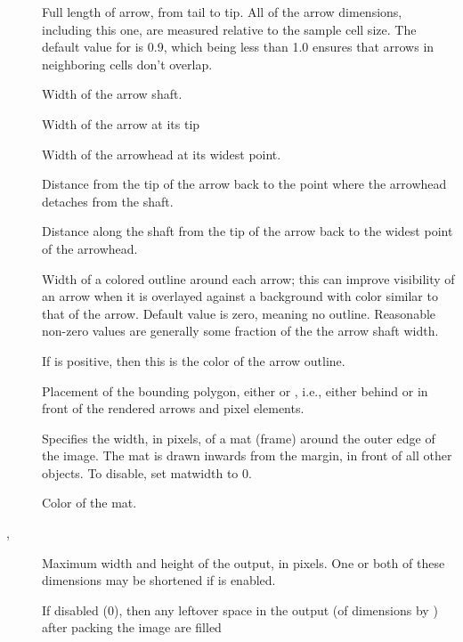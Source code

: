\begin{description}
\item[]
  Full length of arrow, from tail to tip. All of the arrow dimensions,
  including this one, are measured relative to the sample cell size. The
  default value for  is 0.9, which being less than 1.0
  ensures that arrows in neighboring cells don't overlap.
\item[]
  Width of the arrow shaft.
\item[]
  Width of the arrow at its tip
\item[]
  Width of the arrowhead at its widest point.
\item[]
  Distance from the tip of the arrow back to the point where the
  arrowhead detaches from the shaft.
\item[]
  Distance along the shaft from the tip of the arrow back to the widest
  point of the arrowhead.
\item[]
 Width of a colored outline around each arrow; this can improve
 visibility of an arrow when it is overlayed against a background with
 color similar to that of the arrow.  Default value is zero, meaning no
 outline. Reasonable non-zero values are generally some fraction of the
 the arrow shaft width.
\item[]
 If  is positive, then this is the color of the
 arrow outline.
\item[]
 Placement of the bounding polygon, either  or ,
 i.e., either behind or in front of the rendered arrows and pixel
 elements.
\item[]
 Specifies the width, in pixels, of a mat (frame) around the outer edge
 of the image.  The mat is drawn inwards from the margin, in front of
 all other objects.  To disable, set matwidth to 0.
\item[]
 Color of the mat.
\item[, ]
  Maximum width and height of the output, in pixels.
  One or both of these dimensions may be shortened if
   is enabled.
\item[]
 If disabled (0), then any leftover space in the output (of dimensions
  by ) after packing the image are filled

\end{description}
